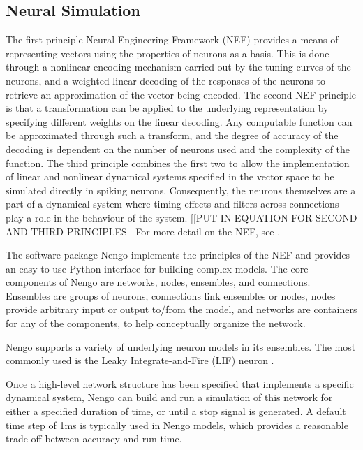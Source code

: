 \documentclass[letterpaper, 10 pt, conference]{ieeeconf}  %
\begin{document}
\subsection{Neural Simulation}

The first principle Neural Engineering Framework (NEF)\cite{eliasmith2004neural} provides a means of representing vectors using the properties of neurons as a basis.
This is done through a nonlinear encoding mechanism carried out by the tuning curves of the neurons, and a weighted linear decoding of the responses of the neurons to retrieve an approximation of the vector being encoded.
The second NEF principle is that a transformation can be applied to the underlying representation by specifying different weights on the linear decoding.
Any computable function can be approximated through such a transform, and the degree of accuracy of the decoding is dependent on the number of neurons used and the complexity of the function.
The third principle combines the first two to allow the implementation of linear and nonlinear dynamical systems specified in the vector space to be simulated directly in spiking neurons.
Consequently, the neurons themselves are a part of a dynamical system where timing effects and filters across connections play a role in the behaviour of the system. 
[[PUT IN EQUATION FOR SECOND AND THIRD PRINCIPLES]] %
For more detail on the NEF, see \cite{eliasmith2004neural}.%

The software package Nengo \cite{bekolay2013nengo} implements the principles of the NEF and provides an easy to use Python interface for building complex models.
The core components of Nengo are networks, nodes, ensembles, and connections.
Ensembles are groups of neurons, connections link ensembles or nodes, nodes provide arbitrary input or output to/from the model, and networks are containers for any of the components, to help conceptually organize the network.

Nengo supports a variety of underlying neuron models in its ensembles.
The most commonly used is the Leaky Integrate-and-Fire (LIF) neuron \cite{burkitt2006review}.

Once a high-level network structure has been specified that implements a specific dynamical system, Nengo can build and run a simulation of this network for either a specified duration of time, or until a stop signal is generated. 
A default time step of 1ms is typically used in Nengo models, which provides a reasonable trade-off between accuracy and run-time.
\end{document}
